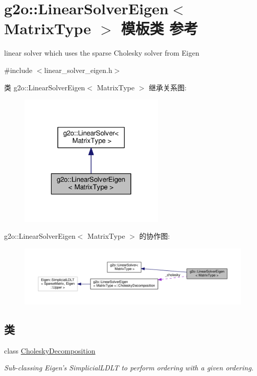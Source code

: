 \hypertarget{classg2o_1_1LinearSolverEigen}{\section{g2o\-:\-:Linear\-Solver\-Eigen$<$ Matrix\-Type $>$ 模板类 参考}
\label{classg2o_1_1LinearSolverEigen}
}


linear solver which uses the sparse Cholesky solver from Eigen  




{\ttfamily \#include $<$linear\-\_\-solver\-\_\-eigen.\-h$>$}



类 g2o\-:\-:Linear\-Solver\-Eigen$<$ Matrix\-Type $>$ 继承关系图\-:
\nopagebreak
\begin{figure}[H]
\begin{center}
\leavevmode
\includegraphics[width=196pt]{classg2o_1_1LinearSolverEigen__inherit__graph}
\end{center}
\end{figure}


g2o\-:\-:Linear\-Solver\-Eigen$<$ Matrix\-Type $>$ 的协作图\-:
\nopagebreak
\begin{figure}[H]
\begin{center}
\leavevmode
\includegraphics[width=350pt]{classg2o_1_1LinearSolverEigen__coll__graph}
\end{center}
\end{figure}
\subsection*{类}
\begin{DoxyCompactItemize}
\item 
class \hyperlink{classg2o_1_1LinearSolverEigen_1_1CholeskyDecomposition}{Cholesky\-Decomposition}
\begin{DoxyCompactList}\small\item\em Sub-\/classing Eigen's Simplicial\-L\-D\-L\-T to perform ordering with a given ordering. \end{DoxyCompactList}\end{DoxyCompactItemize}
